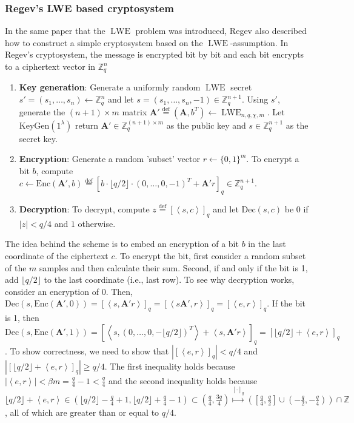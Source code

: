 \subsubsection*{Regev's LWE based cryptosystem}
In the same paper that the $\operatorname{LWE}$ problem was introduced, Regev also described how to construct a simple cryptosystem based on the $\operatorname{LWE}$-assumption. In Regev's cryptosystem, the message is encrypted bit by bit and each bit encrypts to a ciphertext vector in $\mathbb{Z}_q^n$
\begin{enumerate}
    \item \textbf{Key generation}: Generate a uniformly random $\operatorname{LWE}$ secret $s' = (s_1, \dots, s_n) \leftarrow \mathbb{Z}_q^n$ and let $s = (s_1, \dots, s_n, -1) \in \mathbb{Z}_q^{n+1}$. Using $s'$, generate the $(n+1) \times m$ matrix $\textbf{A}' \stackrel{\mathrm{def}}{=} (\textbf{A}, b^T) \leftarrow \operatorname{LWE}_{n,q,\chi,m}$. Let $\text{KeyGen}(1^\lambda)$ return $\textbf{A}' \in \mathbb{Z}_q^{(n+1)\times m}$ as the public key and $s \in \mathbb{Z}_q^{n+1}$ as the secret key.
    \item \textbf{Encryption}: Generate a random 'subset' vector $r \leftarrow \{0,1\}^m$. To encrypt a bit $b$, compute $c \leftarrow \text{Enc}(\textbf{A}',b) \stackrel{\mathrm{def}}{=} [b \cdot \lfloor q/2 \rfloor \cdot (0, \dots, 0, -1)^T + \textbf{A}'r]_q \in \mathbb{Z}_q^{n+1}$.
    \item \textbf{Decryption}: To decrypt, compute $z \stackrel{\mathrm{def}}{=} [\left \langle s, c \right \rangle]_q$ and let $\text{Dec}(s,c)$ be $0$ if $|z| < q/4$ and $1$ otherwise.
\end{enumerate}

The idea behind the scheme is to embed an encryption of a bit $b$ in the last coordinate of the ciphertext $c$. To encrypt the bit, first consider a random subset of the $m$ samples and then calculate their sum. Second, if and only if the bit is 1, add $\lfloor q/2 \rfloor$ to the last coordinate (i.e., last row). To see why decryption works, consider an encryption of $0$. Then, $\text{Dec}(s,\text{Enc}(\textbf{A}',0))= [\left \langle s, \textbf{A}'r \right \rangle]_q = [\left \langle s \textbf{A}', r \right \rangle]_q = [\left \langle e, r \right \rangle]_q$. If the bit is 1, then $\text{Dec}(s,\text{Enc}(\textbf{A}',1)) = [\left \langle s, (0, \dots, 0, -\lfloor q/2 \rfloor)^T \right \rangle + \left \langle s, \textbf{A}'r \right \rangle ]_q = [\lfloor q/2 \rfloor + \left \langle e, r \right \rangle]_q$.
To show correctness, we need to show that $|[\left \langle e, r \right \rangle]_q| < q/4$ and $|[\lfloor q/2 \rfloor + \left \langle e, r \right \rangle]_q| \geq q/4$. The first inequality holds because $| \left \langle e, r \right \rangle | < \beta m = \frac{q}{4} - 1 < \frac{q}{4}$ and the second inequality holds because $\lfloor q/2 \rfloor + \left \langle e, r \right \rangle \in (\lfloor q/2 \rfloor - \frac{q}{4} + 1, \lfloor q/2 \rfloor + \frac{q}{4} - 1) \subset (\frac{q}{4},\frac{3q}{4}) \stackrel{[\cdot]_q}{\mapsto} ([\frac{q}{4},\frac{q}{2}] \cup (-\frac{q}{2} , -\frac{q}{4})) \cap \mathbb{Z}$, all of which are greater than or equal to $q/4$.


